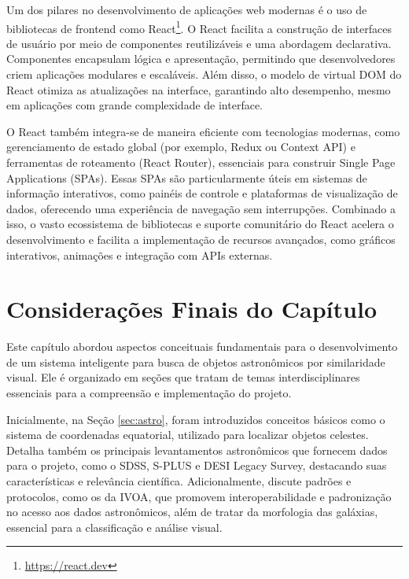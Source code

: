 Um dos pilares no desenvolvimento de aplicações web modernas é o uso de bibliotecas de frontend como React\footnote{\url{https://react.dev}}. O React facilita a construção de interfaces de usuário por meio de componentes reutilizáveis e uma abordagem declarativa. Componentes encapsulam lógica e apresentação, permitindo que desenvolvedores criem aplicações modulares e escaláveis. Além disso, o modelo de virtual DOM do React otimiza as atualizações na interface, garantindo alto desempenho, mesmo em aplicações com grande complexidade de interface.

O React também integra-se de maneira eficiente com tecnologias modernas, como gerenciamento de estado global (por exemplo, Redux ou Context API) e ferramentas de roteamento (React Router), essenciais para construir Single Page Applications (SPAs). Essas SPAs são particularmente úteis em sistemas de informação interativos, como painéis de controle e plataformas de visualização de dados, oferecendo uma experiência de navegação sem interrupções. Combinado a isso, o vasto ecossistema de bibliotecas e suporte comunitário do React acelera o desenvolvimento e facilita a implementação de recursos avançados, como gráficos interativos, animações e integração com APIs externas.







\section{Considerações Finais do Capítulo}

Este capítulo abordou aspectos conceituais fundamentais para o desenvolvimento de um sistema inteligente para busca de objetos astronômicos por similaridade visual. Ele é organizado em  seções que tratam de temas interdisciplinares essenciais para a compreensão e implementação do projeto.

Inicialmente, na Seção \ref{sec:astro}, foram introduzidos conceitos básicos como o sistema de coordenadas equatorial, utilizado para localizar objetos celestes. Detalha também os principais levantamentos astronômicos que fornecem dados para o projeto, como o SDSS, S-PLUS e DESI Legacy Survey, destacando suas características e relevância científica. Adicionalmente, discute padrões e protocolos, como os da IVOA, que promovem interoperabilidade e padronização no acesso aos dados astronômicos, além de tratar da morfologia das galáxias, essencial para a classificação e análise visual.

